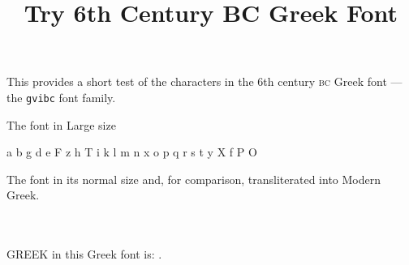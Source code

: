 \documentclass{article}
\title{Try 6th Century BC Greek Font}
\author{}
\date{}
\newcommand{\abc}{a b g d e F z h T i k l m n x o p q r s t y X f P O}
\newcommand{\Acomms}{\Aalpha%
                     \Abeta%
                     \Agamma%
                     \Adelta%
                     \Aepsilon%
                     \Adigamma%
                     \Azeta%
                     \Aeta%
                     \Atheta%
                     \Aiota%
                     \Akappa%
                     \Alambda%
                     \Amu%
                     \Anu%
                     \Axi%
                     \Aomicron%
                     \Api%
                     \Akoppa%
                     \Arho%
                     \Asigma%
                     \Atau%
                     \Aupsilon%
                     \Achi%
                     \Aphi%
                     \Apsi%
                     \Aomega}
\begin{document}
\maketitle


    This provides a short test of the characters in the 6th century \textsc{bc} Greek 
font
--- the \verb|gvibc| font family.

\begin{center}
The font in Large size \\
{\gvibcfamily\Large \abc \par}
\end{center}

\begin{center}
The font in its normal size and, for comparison, transliterated into
Modern Greek. \\
\textgvibc{\Acomms} \\
\translitgvibc{\Acomms} \\
\end{center}

    GREEK in this Greek font is: .
\end{document}
